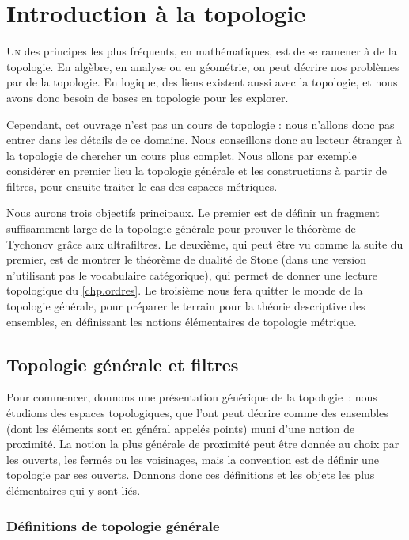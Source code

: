 \chapter[Topologie]{Introduction à la topologie}
\label{chp.topo}

\minitoc

\lettrine{U}{n} des principes les plus fréquents, en mathématiques, est de se
ramener à de la topologie. En algèbre, en analyse ou en géométrie, on peut
décrire nos problèmes par de la topologie. En logique, des liens existent aussi
avec la topologie, et nous avons donc besoin de bases en topologie pour les
explorer.

Cependant, cet ouvrage n'est pas un cours de topologie : nous n'allons donc pas
entrer dans les détails de ce domaine. Nous conseillons donc au lecteur étranger
à la topologie de chercher un cours plus complet. Nous allons par exemple
considérer en premier lieu la topologie générale et les constructions à partir
de filtres, pour ensuite traiter le cas des espaces métriques.

Nous aurons trois objectifs principaux.
Le premier est de définir un fragment suffisamment large de la topologie
générale pour prouver le théorème de Tychonov grâce aux ultrafiltres.
Le deuxième, qui peut être vu comme la suite du premier, est de montrer le
théorème de dualité de Stone (dans une version n'utilisant pas le vocabulaire
catégorique), qui permet de donner une lecture topologique du \cref{chp.ordres}.
Le troisième nous fera quitter le monde de la topologie générale, pour préparer
le terrain pour la théorie descriptive des ensembles, en définissant les notions
élémentaires de topologie métrique.

\section{Topologie générale et filtres}

Pour commencer, donnons une présentation générique de la topologie~: nous
étudions des espaces topologiques, que l'ont peut décrire comme des ensembles
(dont les éléments sont en général appelés \og points\fg{}) muni d'une notion de
proximité. La notion la plus générale de proximité peut être donnée au choix
par les ouverts, les fermés ou les voisinages, mais la convention est de définir
une topologie par ses ouverts. Donnons donc ces définitions et les objets les
plus élémentaires qui y sont liés.

\subsection{Définitions de topologie générale}

